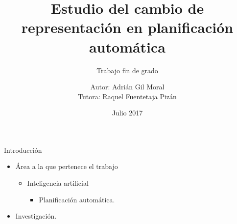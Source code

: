 \documentclass{beamer}
\title[Estudio del cambio de representación en PA]
{Estudio del cambio de representación en planificación automática}
\subtitle{Trabajo fin de grado}
\author[Adrián Gil Moral] %
{Autor: Adrián Gil Moral \\ Tutora: Raquel Fuentetaja Pizán}
\institute[UC3M]
{
  Departamento de informática \\
  Universidad Carlos III de Madrid
}
\date[Julio 2017] %
{Julio 2017}
\begin{document}

\frame{\titlepage}

\begin{frame}{Introducción}
    
    \begin{itemize}
        \item Área a la que pertenece el trabajo
        \begin{itemize}
            \item Inteligencia artificial
            \begin{itemize}
                \item Planificación automática.
            \end{itemize}
        \end{itemize}
        \item Investigación.
        
    \end{itemize}
\end{frame}

\end{document}
